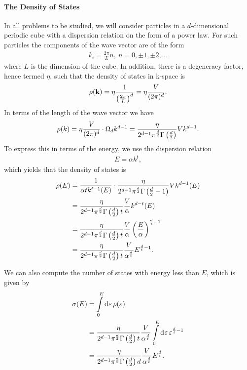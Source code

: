 \paragraph{The Density of States}
In all problems to be studied, we will consider particles in a $d$-dimensional periodic cube with a dispersion relation on the form of a power law. For such particles the components of the wave vector are of the form
\begin{align*}
	k_{i} = \frac{2\pi}{L}n,\ n = 0, \pm 1, \pm 2, \dots
\end{align*}
where $L$ is the dimension of the cube. In addition, there is a degeneracy factor, hence termed $\eta$, such that the density of states in k-space is
\begin{align*}
	\rho(\vb{k}) = \eta\frac{1}{\left(\frac{2\pi}{L}\right)^{d}} = \eta\frac{V}{(2\pi)^{d}}.
\end{align*}
In terms of the length of the wave vector we have
\begin{align*}
	\rho(k) = \eta\frac{V}{(2\pi)^{d}}\cdot \Omega_{d}k^{d - 1} = \frac{\eta}{2^{d - 1}\pi^{\frac{d}{2}}\Gamma\left(\frac{d}{2}\right)}Vk^{d - 1}.
\end{align*}
To express this in terms of the energy, we use the dispersion relation
\begin{align*}
	E = \alpha k^{t},
\end{align*}
which yields that the density of states is
\begin{align*}
	\rho(E) &= \frac{1}{\alpha tk^{t - 1}(E)}\cdot \frac{\eta}{2^{d - 1}\pi^{\frac{d}{2}}\Gamma\left(\frac{d}{2} - 1\right)}Vk^{d - 1}(E) \\
	        &= \frac{\eta}{2^{d - 1}\pi^{\frac{d}{2}}\Gamma\left(\frac{d}{2}\right)t}\frac{V}{\alpha}k^{d - t}(E) \\
	        &= \frac{\eta}{2^{d - 1}\pi^{\frac{d}{2}}\Gamma\left(\frac{d}{2}\right)t}\frac{V}{\alpha}\left(\frac{E}{\alpha}\right)^{\frac{d}{t} - 1} \\
	        &= \frac{\eta}{2^{d - 1}\pi^{\frac{d}{2}}\Gamma\left(\frac{d}{2}\right)t}\frac{V}{\alpha^{\frac{d}{t}}}E^{\frac{d}{t} - 1}.
\end{align*}

We can also compute the number of states with energy less than $E$, which is given by
\begin{align*}
	\sigma(E) &= \int\limits_{0}^{E}\dd[]{\varepsilon}\rho(\varepsilon) \\
              &= \frac{\eta}{2^{d - 1}\pi^{\frac{d}{2}}\Gamma\left(\frac{d}{2}\right)t}\frac{V}{\alpha^{\frac{d}{t}}}\int\limits_{0}^{E}\dd[]{\varepsilon}\varepsilon^{\frac{d}{t} - 1} \\
              &= \frac{\eta}{2^{d - 1}\pi^{\frac{d}{2}}\Gamma\left(\frac{d}{2}\right)d}\frac{V}{\alpha^{\frac{d}{t}}}E^{\frac{d}{t}}.
\end{align*}

